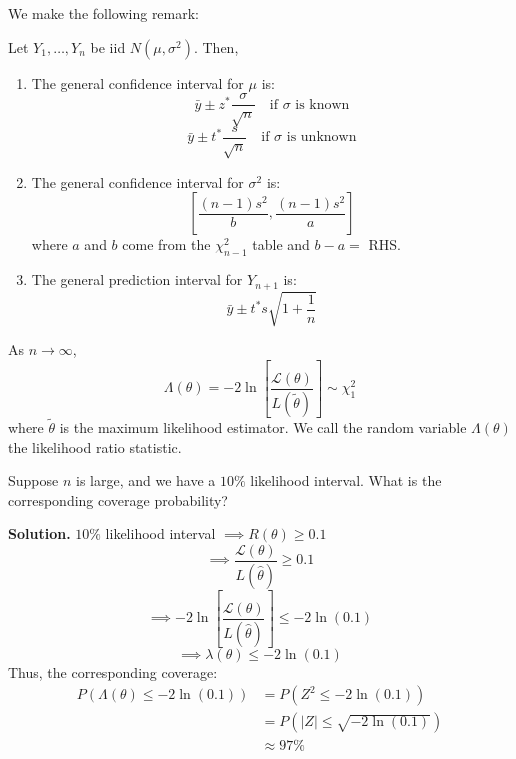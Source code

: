 We make the following remark:
\begin{Remark}{}{} Let $ Y_1,\ldots ,Y_{n} $ be iid $ N(\mu,\sigma^2) $. Then,
    \begin{enumerate}[label=(\roman*)]
        \item The general confidence interval for $ \mu $ is:
              \[ \bar{y}\pm z^* \frac{\sigma}{\sqrt{n}} \quad\text{if $\sigma$ is known} \]
              \[ \bar{y}\pm t^* \frac{s}{\sqrt{n}} \quad\text{if $\sigma$ is unknown} \]
        \item The general confidence interval for $ \sigma^2 $ is:
              \[ \left[ \frac{(n-1)s^2}{b} ,\frac{(n-1)s^2}{a} \right] \]
              where $ a $ and $ b $ come from the $ \chi^2_{n-1} $ table
              and $ b-a= $ RHS\@.
        \item The general prediction interval for $ Y_{n+1} $ is:
              \[ \bar{y}\pm t^* s \sqrt{1+\frac{1}{n}} \]
    \end{enumerate}
\end{Remark}


\begin{Theorem}{}{}
    As $ n\to \infty $,
    \[ \Lambda(\theta)=-2\ln\left[  \frac{\mathcal{L}(\theta)}{L(\tilde{\theta})} \right] \sim \chi^2_1  \]
    where $ \tilde{\theta} $ is the maximum likelihood estimator. We call the random
    variable $ \Lambda(\theta) $ the likelihood ratio statistic.
\end{Theorem}



\begin{Example}{}{}
    Suppose $ n $ is large, and we have a $ 10\% $ likelihood interval. What is the corresponding
    coverage probability?

    \textbf{Solution.} $ 10\% $ likelihood interval $ \implies R(\theta)\geqslant 0.1 $
    \[ \implies \frac{\mathcal{L}(\theta)}{L(\hat{\theta})}\geqslant 0.1  \]
    \[ \implies -2\ln\left[  \frac{\mathcal{L}(\theta)}{L(\hat{\theta})} \right]\leqslant -2\ln(0.1)  \]
    \[ \implies \lambda(\theta)\leqslant -2\ln(0.1) \]
    Thus, the corresponding coverage:
    \begin{align*}
        P(\Lambda(\theta)\leqslant -2\ln(0.1))
         & = P(Z^2\leqslant -2\ln(0.1))        \\
         & = P(|Z|\leqslant \sqrt{-2\ln(0.1)}) \\
         & \approx 97\%
    \end{align*}
\end{Example}

